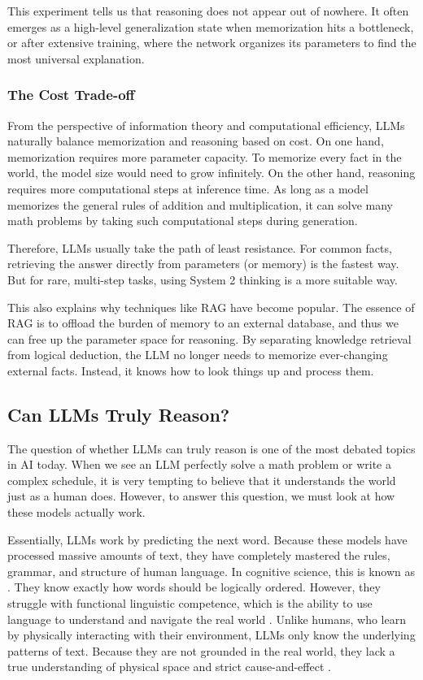 This experiment tells us that reasoning does not appear out of nowhere. It often emerges as a high-level generalization state when memorization hits a bottleneck, or after extensive training, where the network organizes its parameters to find the most universal explanation.

\subsubsection{The Cost Trade-off}

From the perspective of information theory and computational efficiency, LLMs naturally balance memorization and reasoning based on cost. On one hand, memorization requires more parameter capacity. To memorize every fact in the world, the model size would need to grow infinitely. On the other hand, reasoning requires more computational steps at inference time. As long as a model memorizes the general rules of addition and multiplication, it can solve many math problems by taking such computational steps during generation.

Therefore, LLMs usually take the path of least resistance. For common facts, retrieving the answer directly from parameters (or memory) is the fastest way. But for rare, multi-step tasks, using System 2 thinking is a more suitable way.

This also explains why techniques like RAG have become popular. The essence of RAG is to offload the burden of memory to an external database, and thus we can free up the parameter space for reasoning. By separating knowledge retrieval from logical deduction, the LLM no longer needs to memorize ever-changing external facts. Instead, it knows how to look things up and process them.

\subsection{Can LLMs Truly Reason?}

The question of whether LLMs can truly reason is one of the most debated topics in AI today. When we see an LLM perfectly solve a math problem or write a complex schedule, it is very tempting to believe that it understands the world just as a human does. However, to answer this question, we must look at how these models actually work.

Essentially, LLMs work by predicting the next word. Because these models have processed massive amounts of text, they have completely mastered the rules, grammar, and structure of human language. In cognitive science, this is known as  \cite{chomsky:1965aspects,mahowald-etal:2024dissociating}. They know exactly how words should be logically ordered. However, they struggle with functional linguistic competence, which is the ability to use language to understand and navigate the real world \cite{kambhampati-etal:2024llms}. Unlike humans, who learn by physically interacting with their environment, LLMs only know the underlying patterns of text. Because they are not grounded in the real world, they lack a true understanding of physical space and strict cause-and-effect \cite{mahowald-etal:2024dissociating}.

